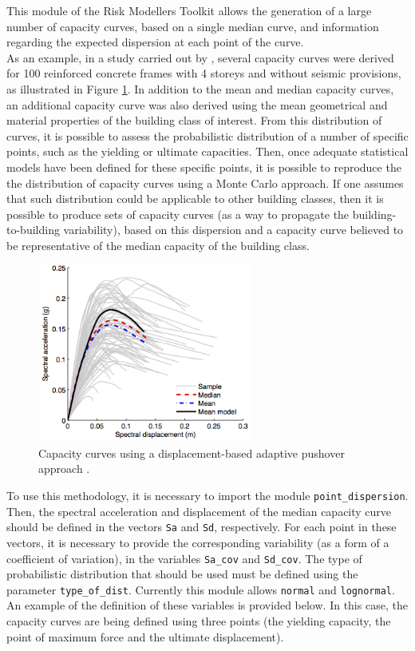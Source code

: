This module of the Risk Modellers Toolkit allows the generation of a large number of capacity curves, based on a single median curve, and information regarding the expected dispersion at each point of the curve. \\

As an example, in a study carried out by \cite{SilvaEtAl2014b}, several capacity curves were derived for 100 reinforced concrete frames with 4 storeys and without seismic provisions, as illustrated in Figure \ref{fig:set_cc}. In addition to the mean and median capacity curves, an additional capacity curve was also derived using the mean geometrical and material properties of the building class of interest. From this distribution of curves, it is possible to assess the probabilistic distribution of a number of specific points, such as the yielding or ultimate capacities. Then, once adequate statistical models have been defined for these specific points, it is possible to reproduce the the distribution of capacity curves using a Monte Carlo approach. If one assumes that such distribution could be applicable to other building classes, then it is possible to produce sets of capacity curves (as a way to propagate the building-to-building variability), based on this dispersion and a capacity curve believed to be representative of the median capacity of the building class.

\begin{figure}[htb]
  \centering
      \includegraphics[width=7cm]{Figures/set_capacity_curves.png}
  \caption{Capacity curves using a displacement-based adaptive pushover approach \citep{SilvaEtAl2014b}.}
  \label{fig:set_cc}
\end{figure}

To use this methodology, it is necessary to import the module \verb=point_dispersion=. Then, the spectral acceleration and displacement of the median capacity curve should be defined in the vectors \verb=Sa= and \verb=Sd=, respectively. For each point in these vectors, it is necessary to provide the corresponding variability (as a form of a coefficient of variation), in the variables \verb=Sa_cov= and \verb=Sd_cov=. The type of probabilistic distribution that should be used must be defined using the parameter \verb=type_of_dist=. Currently this module allows \verb=normal= and \verb=lognormal=. An example of the definition of these variables is provided below. In this case, the capacity curves are being defined using three points (the yielding capacity, the point of maximum force and the ultimate displacement).

